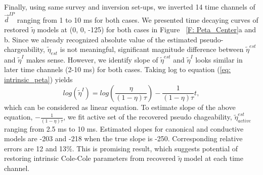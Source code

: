 \documentclass[a4paper, 11pt]{article}
\renewcommand {\d}  { {\vec d} }
\newcommand{\peta}{\tilde{\eta}}
\begin{document}
Finally, using same survey and inversion set-ups, we inverted 14 time channels of $\d^{IP}$ ranging from 1 to 10 ms for both cases. We presented time decaying curves of restored $\peta$ models at (0, 0, -125) for both cases in Figure ~\ref{F: Peta_Center}a and b. Since we already recognized absolute value of the estimated pseudo-chargeability, $\peta_{est}$ is not meaningful, significant magnitude difference between $\peta^{est}$ and $\peta^I$ makes sense. However, we identify slope of $\peta^{est}$ and $\peta^I$ looks similar in later time channels (2-10 ms) for both cases. Taking log to equation (\ref{eq: intrinsic_peta}) yields
\begin{equation}
    log(\peta^{I}) = log(\frac{\eta}{(1-\eta)\tau}) - \frac{1}{(1-\eta)\tau}t,
\end{equation}
which can be considered as linear equation. To estimate slope of the above equation, $- \frac{1}{(1-\eta)\tau}$, we fit active set of the recovered pseudo chageability, $\peta^{est}_{active}$ ranging from 2.5 ms to 10 ms. Estimated slopes for canonical and conductive models are -203 and -218 when the true slope is -250. Corresponding relative errors are 12 and 13$\%$. This is promising result, which suggests potential of restoring intrinsic Cole-Cole parameters from recovered $\peta$ model at each time channel.
\end{document}
